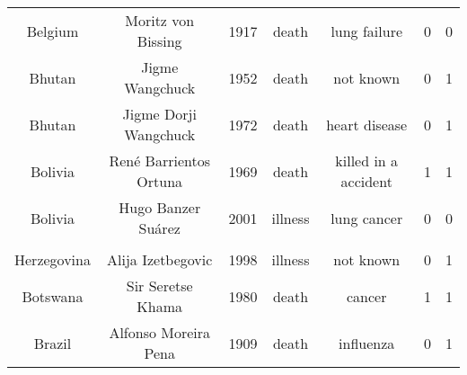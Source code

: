 \begin{center}
\begin{longtable}{ccccccc}
Belgium                                                                    & Moritz von Bissing                                                                    & 1917       & death         & lung failure                                                           & 0        & 0       \\
Bhutan                                                                     & Jigme Wangchuck                                                                       & 1952       & death         & not known                                                              & 0        & 1       \\
Bhutan                                                                     & Jigme Dorji Wangchuck                                                                 & 1972       & death         & heart disease                                                          & 0        & 1       \\
Bolivia                                                                    & René Barrientos Ortuna                                                                & 1969       & death         & killed in a accident                                                   & 1        & 1       \\
Bolivia                                                                    & Hugo Banzer Suárez                                                                    & 2001       & illness       & lung cancer                                                            & 0        & 0       \\
\begin{tabular}[c]{@{}c@{}}Bosnia and\\ Herzegovina\end{tabular}           & Alija Izetbegovic                                                                     & 1998       & illness       & not known                                                              & 0        & 1       \\
Botswana                                                                   & Sir Seretse Khama                                                                     & 1980       & death         & cancer                                                                 & 1        & 1       \\
Brazil                                                                     & Alfonso Moreira Pena                                                                  & 1909       & death         & influenza                                                              & 0        & 1       \\

\end{longtable}
\end{center}
